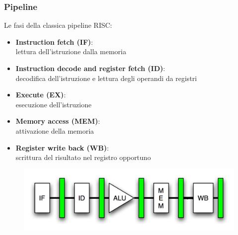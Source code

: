 \begin{frame}
	\frametitle{ Pipeline}

		Le fasi della classica pipeline RISC:
		\begin{itemize}
			\item \textbf{Instruction fetch (IF)}:\\ lettura dell'istruzione dalla memoria
			\item \textbf{Instruction decode and register fetch (ID)}:\\ decodifica dell'istruzione e lettura degli operandi da registri
			\item \textbf{Execute (EX)}:\\ esecuzione dell’istruzione
			\item \textbf{Memory access (MEM)}:\\ attivazione della memoria
			\item \textbf{Register write back (WB)}:\\ scrittura del risultato nel registro opportuno
		\end{itemize}
		
		\begin{figure}[!htbp]
			\centering 
			\includegraphics[width=0.63\linewidth]{images/7_pipeline/pipeline_base.png}
			\label{fig:pipeline_pipeline_base}
		\end{figure}
		

\end{frame}


